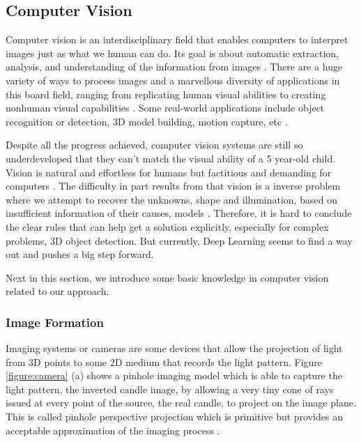\subsection{Computer Vision}

Computer vision is an interdisciplinary field that  enables computers to interpret images just as what we human can do. Its goal is about automatic extraction, analysis, and understanding of the information from images \cite{BMVA}. There are a huge variety of ways to process images and a marvellous diversity of applications in this board field, ranging from replicating human visual abilities to creating nonhuman visual capabilities \cite{Goodfellow-et-al-2016}. Some real-world applications include object recognition or detection, 3D model building, motion capture, etc \cite{szeliski2011computer}.

Despite all the progress achieved, computer vision systems are still so underdeveloped that they can't match the visual ability of a 5 year-old child. Vision is natural and effortless for humans but factitious and demanding for computers \cite{parallel}. The difficulty in part results from that vision is a inverse problem where we attempt to recover the unknowns, \eg shape and illumination,  based on insufficient information of their causes, \eg models \cite{szeliski2011computer}.  Therefore, it is hard to  conclude the clear rules that can help get a solution explicitly, especially for complex problems, \eg 3D object detection. But currently, Deep Learning seems to find a way out and pushes a big step forward.

Next in this section, we introduce some basic knowledge in computer vision related to our approach.

\subsubsection{Image Formation}

Imaging systems or cameras are some devices that allow the projection of light from 3D points to some 2D medium that records the light pattern. Figure \ref{figure:camera} (a) shows a pinhole imaging model which is able to capture the light pattern, the inverted candle image, by allowing a very tiny cone of rays issued  at every point of the source, the real candle,  to project on the image plane. This is called pinhole perspective projection which is primitive but provides an acceptable approximation of the imaging process \cite{Forsyth:2002:CVM:580035}. 

